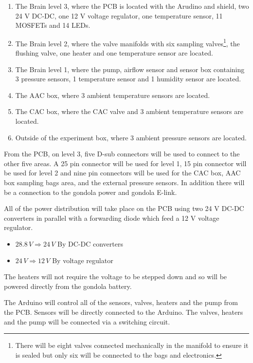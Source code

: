 \begin{enumerate}
    \item The Brain level 3, where the PCB is located with the Arudino and shield, two 24 V DC-DC, one 12 V voltage regulator, one temperature sensor, 11 MOSFETs and 14 LEDs.
    \item The Brain level 2, where the valve manifolds with six sampling valves\footnote{There will be eight valves connected mechanically in the manifold to ensure it is sealed but only six will be connected to the bags and electronics.\label{fn:extravalve}}, the flushing valve, one heater and one temperature sensor are located.
    \item The Brain level 1, where the pump, airflow sensor and sensor box containing 3 pressure sensors, 1 temperature sensor and 1 humidity sensor are located.
    \item The AAC box, where 3 ambient temperature sensors are located.
    \item The CAC box, where the CAC valve and 3 ambient temperature sensors are located.
    \item Outside of the experiment box, where 3 ambient pressure sensors are located.
\end{enumerate}

From the PCB, on level 3, five D-sub connectors will be used to connect to the other five areas. A 25 pin connector will be used for level 1, 15 pin connector will be used for level 2 and nine pin connectors will be used for the CAC box, AAC box sampling bags area, and the external pressure sensors. In addition there will be a connection to the gondola power and gondola E-link.

All of the power distribution will take place on the PCB using two 24 V DC-DC converters in parallel with a forwarding diode which feed a 12 V voltage regulator. 
\begin{itemize}
  \item $28.8 \, V \Longrightarrow 24 \, V $ By DC-DC converters
  \item $24 \, V \Longrightarrow 12 \, V$ By voltage regulator
  \end{itemize}
The heaters will not require the voltage to be stepped down and so will be powered directly from the gondola battery.

The Arduino will control all of the sensors, valves, heaters and the pump from the PCB. Sensors will be directly connected to the Arduino. The valves, heaters and the pump will be connected via a switching circuit.

